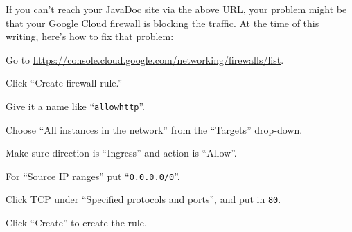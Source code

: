 If you can't reach your JavaDoc site via the above URL, your problem might be
that your Google Cloud firewall is blocking the traffic. At the time of this
writing, here's how to fix that problem:

\begin{compactenum}

\item Go to \url{https://console.cloud.google.com/networking/firewalls/list}.
\item Click ``Create firewall rule.''
\item Give it a name like ``\texttt{allowhttp}''.
\item Choose ``All instances in the network'' from the ``Targets'' drop-down.
\item Make sure direction is ``Ingress'' and action is ``Allow''.
\item For ``Source IP ranges'' put ``\texttt{0.0.0.0/0}''.
\item Click TCP under ``Specified protocols and ports'', and put in \texttt{80}.
\item Click ``Create'' to create the rule.
\end{compactenum}



